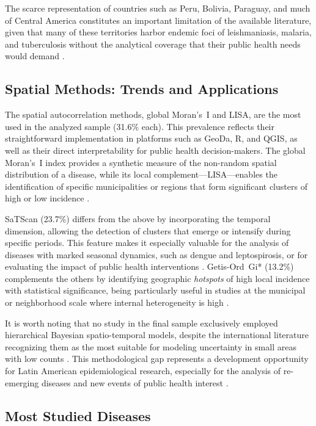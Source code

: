 \documentclass[conference]{IEEEtran}
\begin{document}
The scarce representation of countries such as Peru, Bolivia,
Paraguay, and much of Central America constitutes an
important limitation of the available literature, given that
many of these territories harbor endemic foci of
leishmaniasis, malaria, and tuberculosis without the
analytical coverage that their public health needs would
demand \cite{Habereder2025}.

\subsection{Spatial Methods: Trends and Applications}

The spatial autocorrelation methods, global Moran's~I and
LISA, are the most used in the analyzed sample (31.6\% each).
This prevalence reflects their straightforward implementation
in platforms such as GeoDa, R, and QGIS, as well as their
direct interpretability for public health decision-makers.
The global Moran's~I index provides a synthetic measure of
the non-random spatial distribution of a disease, while its
local complement---LISA---enables the identification of
specific municipalities or regions that form significant
clusters of high or low incidence \cite{Lin2022}.

SaTScan (23.7\%) differs from the above by incorporating the
temporal dimension, allowing the detection of clusters that
emerge or intensify during specific periods. This feature
makes it especially valuable for the analysis of diseases
with marked seasonal dynamics, such as dengue and
leptospirosis, or for evaluating the impact of public health
interventions \cite{Souza2023, Bermudi2025}. Getis-Ord~Gi*
(13.2\%) complements the others by identifying geographic
\textit{hotspots} of high local incidence with statistical
significance, being particularly useful in studies at the
municipal or neighborhood scale where internal heterogeneity
is high \cite{Tavares2024}.

It is worth noting that no study in the final sample
exclusively employed hierarchical Bayesian spatio-temporal
models, despite the international literature recognizing them
as the most suitable for modeling uncertainty in small areas
with low counts \cite{Zhu2022, Chen2022}. This
methodological gap represents a development opportunity for
Latin American epidemiological research, especially for the
analysis of re-emerging diseases and new events of public
health interest \cite{NIRAULA2026100961}.

\subsection{Most Studied Diseases}
\end{document}
